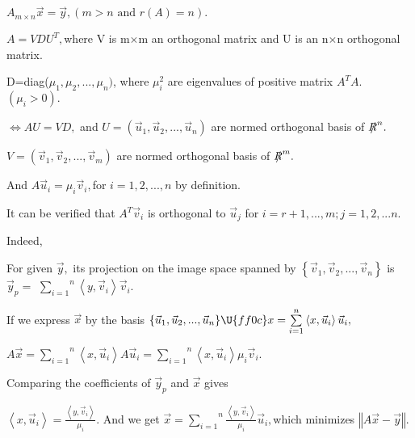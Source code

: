 \documentclass{article}
\begin{document}
$A_{m\times n}\vec{x}=\vec{y},\left( m>n\text{ and }r\left( A\right)
=n\right) .$

$A=VDU^{T},$where V is m$\times $m an orthogonal matrix and U is an n$\times 
$n orthogonal matrix.

D=diag($\mu _{1},\mu _{2},...,\mu _{n})$, where $\mu _{i}^{2}$ are
eigenvalues of positive matrix $A^{T}A$.$\left( \mu _{i}>0\right) .$

$\iff AU=VD,$ and $U=\left( \vec{u}_{1},\vec{u}_{2},...,\vec{u}_{n}\right) $
are normed orthogonal basis of $\NEG{R}^{n}.$

$V=\left( \vec{v}_{1},\vec{v}_{2},...,\vec{v}_{m}\right) $ are normed
orthogonal basis of $\NEG{R}^{m}.$

And $A\vec{u}_{i}=\mu _{i}\vec{v}_{i},$for $i=1,2,...,n$ by definition.

It can be verified that $A^{T}\vec{v}_{i}$ is orthogonal to $\vec{u}_{j}$
for $i=r+1,...,m;j=1,2,...n.$

Indeed, 

For given $\vec{y},$ its projection on the image space spanned by $\left\{ 
\vec{v}_{1},\vec{v}_{2},...,\vec{v}_{n}\right\} $ is $\vec{y}_{p}=$ $\overset%
{n}{\underset{i=1}{\sum }}\left\langle y,\vec{v}_{i}\right\rangle \vec{v}%
_{i}.$

If we express $\vec{x}$ by the basis $\{\vec{u}_{1},\vec{u}_{2},...,\vec{u}%
_{n}\}\U{ff0c} x=\overset{n}{\underset{i=1}{\sum }}\left\langle x,\vec{u}%
_{i}\right\rangle \vec{u}_{i},$

$A\vec{x}=\overset{n}{\underset{i=1}{\sum }}\left\langle x,\vec{u}%
_{i}\right\rangle A\vec{u}_{i}=\overset{n}{\underset{i=1}{\sum }}%
\left\langle x,\vec{u}_{i}\right\rangle \mu _{i}\vec{v}_{i}.$

Comparing the coefficients of $\vec{y}_{p}$ and $\vec{x}$ gives

$\left\langle x,\vec{u}_{i}\right\rangle =\frac{\left\langle y,\vec{v}%
_{i}\right\rangle }{\mu _{i}}.$ And we get $\vec{x}=\overset{n}{\underset{i=1%
}{\sum }}\frac{\left\langle y,\vec{v}_{i}\right\rangle }{\mu _{i}}\vec{u}%
_{i},$which minimizes $\left\Vert A\vec{x}-\vec{y}\right\Vert .$
\end{document}
